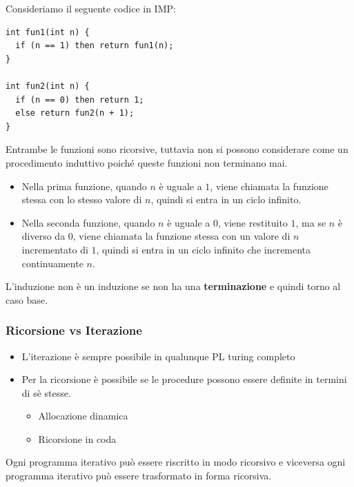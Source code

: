 \documentclass[a4paper]{article}
\begin{document}
\begin{Example}{}{}
  Consideriamo il seguente codice in IMP:
\begin{lstlisting}
int fun1(int n) {
  if (n == 1) then return fun1(n);
}

int fun2(int n) {
  if (n == 0) then return 1;
  else return fun2(n + 1);
}
\end{lstlisting}
\noindent
Entrambe le funzioni sono ricorsive, tuttavia non si possono considerare
come un procedimento induttivo poiché queste funzioni non terminano mai.
\begin{itemize}
  \item Nella prima funzione, quando $n$ è uguale a $1$, viene chiamata la funzione 
  stessa con lo stesso valore di $n$, quindi si entra in un ciclo infinito.
  \item Nella seconda funzione, quando $n$ è uguale a $0$, viene restituito $1$, ma se $n$ 
  è diverso da $0$, viene chiamata la funzione stessa con un valore di $n$ incrementato di $1$, quindi si entra in un ciclo infinito che incrementa continuamente $n$.
\end{itemize}
\noindent
L'induzione non è un induzione se non ha una \textbf{terminazione} e quindi torno al caso base.
\end{Example}

\subsubsection*{Ricorsione vs Iterazione}

\begin{itemize}
  \item L'iterazione è sempre possibile in qualunque PL turing completo
  \item Per la ricorsione è possibile se le procedure possono essere definite in termini di sè stesse.
  \begin{itemize}
    \item Allocazione dinamica 
    \item Ricorsione in coda 
  \end{itemize}
\end{itemize}
Ogni programma iterativo può essere riscritto in modo ricorsivo 
e viceversa ogni programma iterativo
può essere trasformato in forma ricorsiva.
\end{document}
